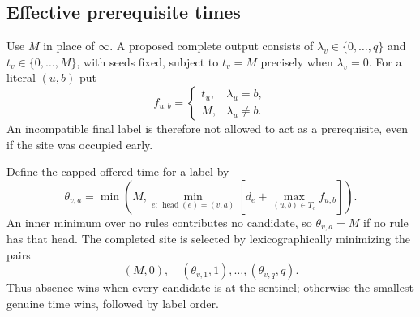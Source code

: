 \documentclass[11pt,letterpaper]{article}
\theoremstyle{definition}
\theoremstyle{remark}
\begin{document}
\subsection{Effective prerequisite times}
Use $M$ in place of $\infty$. A proposed complete output consists of
$\lambda_v\in\{0,\ldots,q\}$ and $t_v\in\{0,\ldots,M\}$, with seeds
fixed, subject to $t_v=M$ precisely when $\lambda_v=0$. For a literal
$(u,b)$ put
\begin{equation}\label{qoc:ts:eq:effective}
 f_{u,b}=\begin{cases}
 t_u,&\lambda_u=b,\\
 M,&\lambda_u\ne b.
 \end{cases}
\end{equation}
An incompatible final label is therefore not allowed to act as a
prerequisite, even if the site was occupied early.

Define the capped offered time for a label by
\begin{equation}\label{qoc:ts:eq:theta}
 \theta_{v,a}=\min\left(M,
 \min_{e:\,\operatorname{head}(e)=(v,a)}
 \left[d_e+\max_{(u,b)\in T_e}f_{u,b}\right]\right).
\end{equation}
An inner minimum over no rules contributes no candidate, so
$\theta_{v,a}=M$ if no rule has that head. The completed site is selected
by lexicographically minimizing the pairs
\begin{equation}\label{qoc:ts:eq:pairwinner}
 (M,0),\quad(\theta_{v,1},1),\ldots,(\theta_{v,q},q).
\end{equation}
Thus absence wins when every candidate is at the sentinel; otherwise the
smallest genuine time wins, followed by label order.
\end{document}
